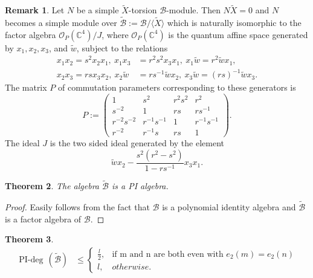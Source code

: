 \documentclass[12 pt,reqno]{amsart}
\numberwithin{equation}{section}
\DeclareMathOperator{\pideg}{PI-deg}
\newtheorem{thm}{Theorem}[section]
\theoremstyle{definition}
\newtheorem{remark}[thm]{Remark}
\theoremstyle{definition}
\theoremstyle{remark}
\theoremstyle{remark}
\begin{document}
\begin{remark}\label{rem1}
  Let $N$ be a simple $\tilde{X}$-torsion $\mathcal{B}$-module. Then $N\tilde{X}=0$ and $N$ becomes a simple module over $\tilde{\mathcal{B}}:=\mathcal{B}/\langle \tilde{X}\rangle$ which is naturally isomorphic to the factor algebra $\mathcal{O}_P(\mathbb{C}^4)/J$, where $\mathcal{O}_P(\mathbb{C}^4)$ is the quantum affine space  generated by $x_1, x_2, x_3$, and $\tilde{w}$, subject to the relations
 \begin{align*}
     x_1x_2=s^2x_2x_1, \ x_1x_3&=r^2s^2x_3x_1, \ x_1\tilde{w}=r^2\tilde{w}x_1,\\
      x_2x_3=rsx_3x_2, \ x_2\tilde{w}&=rs^{-1}\tilde{w}x_2, \ x_3\tilde{w}=(rs)^{-1}\tilde{w}x_3.
 \end{align*} The matrix $P$ of commutation parameters corresponding to these generators is
 \[P:=\begin{pmatrix}
  1& s^2&r^2s^2&r^2\\
  s^{-2}&1&rs&rs^{-1}\\
  r^{-2}s^{-2}&r^{-1}s^{-1}&1&r^{-1}s^{-1}\\
  r^{-2}&r^{-1}s&rs&1
\end{pmatrix}.\] The ideal $J$ is the two sided ideal generated by the element $$\tilde{w}x_2-\displaystyle\frac{s^2(r^2-s^2)}{1-rs^{-1}}x_3x_1.$$
\end{remark}
\begin{thm}
The algebra  $\tilde{\mathcal{B}}$ is a PI algebra.  
\end{thm}
\begin{proof}
    Easily follows from the fact that $\mathcal{B}$ is a polynomial identity algebra and $\tilde{\mathcal{B}}$ is a factor algebra of $\mathcal{B}$.
\end{proof}
\begin{thm}
    \begin{align*}
        \pideg\,\left(\tilde{\mathcal{B}}\right)&\leq\begin{cases}
        \displaystyle\frac{l}{2},  & \text{if m and n are both even with $e_2(m)=e_2(n)$}\\
        l, & otherwise.
    \end{cases}
    \end{align*}
\end{thm}
\end{document}

